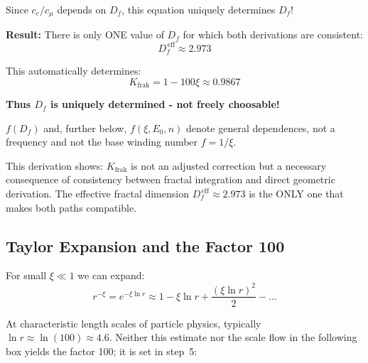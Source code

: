 \begin{tcolorbox}[colback=red!5!white,colframe=red!75!black,title={Unique Determination of $K_{\text{frak}}$ and $D_f$}]
		Since $c_e/c_\mu$ depends on $D_f$, this equation uniquely determines $D_f$!
		
		\textbf{Result:} There is only ONE value of $D_f$ for which both derivations are consistent:
		\begin{equation}
			D_f^{\,\text{eff}} \approx 2.973
		\end{equation}
		
		This automatically determines:
		\begin{equation}
			K_{\text{frak}} = 1 - 100\xi \approx 0.9867
		\end{equation}
		
		\textbf{Thus $D_f$ is uniquely determined - not freely choosable!}
	\end{tcolorbox}

	$f(D_f)$ and, further below, $f(\xi, E_0, n)$ denote general dependences, not a frequency and not the base winding number $f = 1/\xi$.

	This derivation shows: $K_{\text{frak}}$ is not an adjusted correction but a necessary consequence of consistency between fractal integration and direct geometric derivation. The effective fractal dimension $D_f^{\,\text{eff}} \approx 2.973$ is the ONLY one that makes both paths compatible.
	
	\subsection{Taylor Expansion and the Factor 100}
	
	For small $\xi \ll 1$ we can expand:
	\begin{equation}
		r^{-\xi} = e^{-\xi \ln r} \approx 1 - \xi \ln r + \frac{(\xi \ln r)^2}{2} - \ldots
		\label{eq:taylor_expansion}
	\end{equation}
	
	At characteristic length scales of particle physics, typically $\ln r \approx \ln(100) \approx 4.6$. Neither this estimate nor the scale flow in the following box yields the factor 100; it is set in step~5:
	

